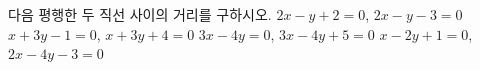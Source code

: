 다음 평행한 두 직선 사이의 거리를 구하시오.
 $2x-y+2=0$, $2x-y-3=0$
 $x+3y-1=0$, $x+3y+4=0$
 $3x-4y=0$, $3x-4y+5=0$
 $x-2y+1=0$, $2x-4y-3=0$

